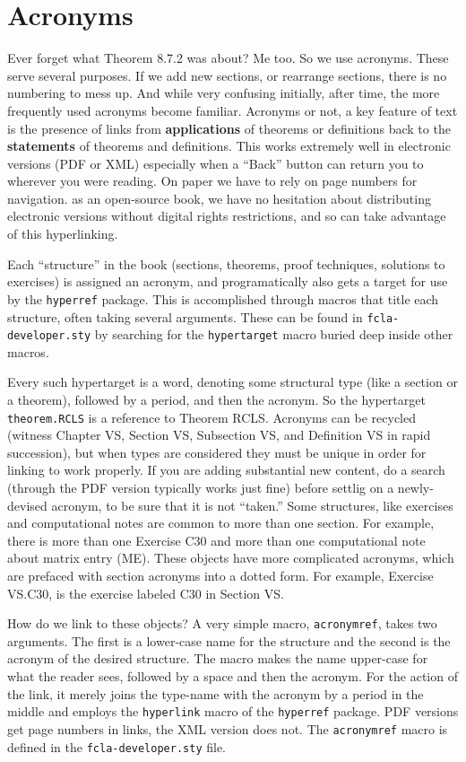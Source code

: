 \documentclass[12pt]{article}
\newcommand{\sourcefile}[1]{{\tt#1}}
\newcommand{\rawtex}[1]{{\tt#1}}
\newcommand{\acronymref}[2]{\MakeUppercase#1 #2}
\begin{document}
\section*{Acronyms}
%
Ever forget what Theorem 8.7.2 was about?  Me too.  So we use acronyms.  These serve several purposes.  If we add new sections, or rearrange sections, there is no numbering to mess up.  And while very confusing initially, after time, the more frequently used acronyms become familiar.  Acronyms or not, a key feature of text is the presence of links from {\bf applications} of theorems or definitions back to the {\bf statements} of theorems and definitions.  This works extremely well in electronic versions (PDF or XML) especially when a ``Back'' button can return you to wherever you were reading.  On paper we have to rely on page numbers for navigation.  as an open-source book, we have no hesitation about distributing electronic versions without digital rights restrictions, and so can take advantage of this hyperlinking.\par
%
Each ``structure'' in the book (sections, theorems, proof techniques, solutions to exercises) is assigned an acronym, and programatically also gets a target for use by the \rawtex{hyperref} package.  This is accomplished through macros that title each structure, often taking several arguments.  These can be found in \sourcefile{fcla-developer.sty} by searching for the \rawtex{hypertarget} macro buried deep inside other macros.\par
%
Every such hypertarget is a word, denoting some structural type (like a section or a theorem), followed by a period, and then the acronym.  So the hypertarget \rawtex{theorem.RCLS} is a reference to \acronymref{theorem}{RCLS}.  Acronyms can be recycled (witness \acronymref{chapter}{VS}, \acronymref{section}{VS}, \acronymref{subsection}{VS}, and \acronymref{definition}{VS} in rapid succession), but when types are considered they must be unique in order for linking to work properly.  If you are adding substantial new content, do a search (through the PDF version typically works just fine) before settlig on a newly-devised acronym, to be sure that it is not ``taken.''  Some structures, like exercises and computational notes are common to more than one section.  For example, there is more than one Exercise C30 and more than one computational note about matrix entry (ME).  These objects have more complicated acronyms, which are prefaced with section acronyms into a dotted form.  For example, \acronymref{Exercise}{VS.C30}, is the exercise labeled C30 in Section VS.\par
%
How do we link to these objects?  A very simple macro, \rawtex{acronymref}, takes two arguments.  The first is a lower-case name for the structure and the second is the acronym of the desired structure.  The macro makes the name upper-case for what the reader sees, followed by a space and then the acronym.  For the action of the link, it merely joins the type-name with the acronym by a period in the middle and employs the \rawtex{hyperlink} macro of the \rawtex{hyperref} package.  PDF versions get page numbers in links, the XML version does not.  The \rawtex{acronymref} macro is defined in the \sourcefile{fcla-developer.sty} file.
%
\end{document}
